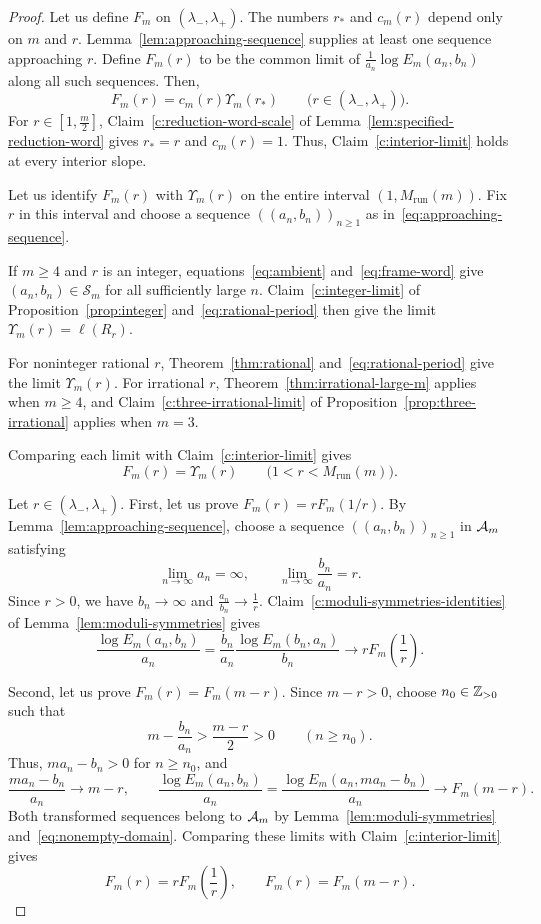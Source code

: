 \begin{proof}
Let us define $F_m$ on $(\lambda_-,\lambda_+)$.
The numbers $r_*$ and $c_m(r)$ depend only on $m$ and $r$.
Lemma~\ref{lem:approaching-sequence} supplies at least one sequence approaching $r$.
Define $F_m(r)$ to be the common limit of $\frac1{a_n}\log E_m(a_n,b_n)$ along all such sequences.
Then,
\[
 F_m(r)=c_m(r)\Upsilon_m(r_*)
 \qquad\bigl(r\in(\lambda_-,\lambda_+)\bigr).
\]
For $r\in[1,\frac{m}{2}]$, Claim~\ref{c:reduction-word-scale} of Lemma~\ref{lem:specified-reduction-word}
gives $r_*=r$ and $c_m(r)=1$.
Thus, Claim~\ref{c:interior-limit} holds at every interior slope.

Let us identify $F_m(r)$ with $\Upsilon_m(r)$ on the entire interval $(1,M_{\mathrm{run}}(m))$.
Fix $r$ in this interval and choose a sequence $((a_n,b_n))_{n\ge1}$ as in~\eqref{eq:approaching-sequence}.

If $m\ge4$ and $r$ is an integer, equations~\eqref{eq:ambient} and~\eqref{eq:frame-word} give $(a_n,b_n)\in\mathcal S_m$ for all sufficiently large $n$.
Claim~\ref{c:integer-limit} of Proposition~\ref{prop:integer} and~\eqref{eq:rational-period} then give the limit $\Upsilon_m(r)=\ell(R_r)$.

For noninteger rational $r$, Theorem~\ref{thm:rational} and~\eqref{eq:rational-period} give the limit $\Upsilon_m(r)$.
For irrational $r$, Theorem~\ref{thm:irrational-large-m} applies when $m\ge4$, and Claim~\ref{c:three-irrational-limit} of Proposition~\ref{prop:three-irrational} applies when $m=3$.

Comparing each limit with Claim~\ref{c:interior-limit} gives
\[
 F_m(r)=\Upsilon_m(r)\qquad\bigl(1<r<M_{\mathrm{run}}(m)\bigr).
\]

Let $r\in(\lambda_-,\lambda_+)$.
First, let us prove $F_m(r)=rF_m(1/r)$.
By Lemma~\ref{lem:approaching-sequence}, choose a sequence $((a_n,b_n))_{n\ge1}$ in $\mathcal A_m$ satisfying
\[
 \lim_{n\to\infty}a_n=\infty,\qquad
 \lim_{n\to\infty}\frac{b_n}{a_n}=r.
\]
Since $r>0$, we have $b_n\to\infty$ and $\frac{a_n}{b_n}\to\frac1r$.
Claim~\ref{c:moduli-symmetries-identities} of Lemma~\ref{lem:moduli-symmetries} gives
\[
 \frac{\log E_m(a_n,b_n)}{a_n}
 =\frac{b_n}{a_n}\frac{\log E_m(b_n,a_n)}{b_n}
 \longrightarrow rF_m\left(\frac1r\right).
\]

Second, let us prove $F_m(r)=F_m(m-r)$.
Since $m-r>0$, choose $n_0\in\mathbb Z_{>0}$ such that
\[
 m-\frac{b_n}{a_n}>\frac{m-r}{2}>0\qquad(n\ge n_0).
\]
Thus, $ma_n-b_n>0$ for $n\ge n_0$, and
\[
 \frac{ma_n-b_n}{a_n}\longrightarrow m-r,\qquad
 \frac{\log E_m(a_n,b_n)}{a_n}
 =\frac{\log E_m(a_n,ma_n-b_n)}{a_n}
 \longrightarrow F_m(m-r).
\]
Both transformed sequences belong to $\mathcal A_m$ by Lemma~\ref{lem:moduli-symmetries}
and~\eqref{eq:nonempty-domain}. Comparing these limits with Claim~\ref{c:interior-limit} gives
\begin{equation}\label{eq:entropy-symmetries}
 F_m(r)=rF_m\left(\frac1r\right),\qquad F_m(r)=F_m(m-r).
\end{equation}


\end{proof}
